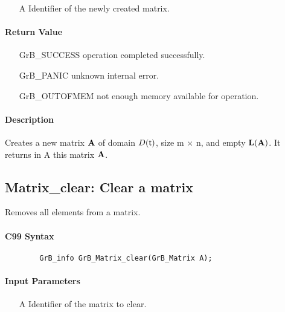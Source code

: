 \begin{itemize}[leftmargin=1.1in]
    \item[{\sf A}] Identifier of the newly created matrix.
\end{itemize}

\paragraph{Return Value}

\begin{itemize}[leftmargin=2.1in]
\item[{\sf GrB\_SUCCESS}]   operation completed successfully.
\item[{\sf GrB\_PANIC}]     unknown internal error.
\item[{\sf GrB\_OUTOFMEM}]  not enough memory available for operation.
\end{itemize}

\paragraph{Description}

Creates a new matrix ${\bf A}$ of domain $D({\sf t})$, size {\sf m $\times$ n}, and
empty $\bold{L}({\bf A})$. It returns in {\sf A} this matrix ${\bf A}$.

\subsection{{\sf Matrix\_clear}: Clear a matrix}

Removes all elements from a matrix.

\paragraph{C99 Syntax}

\begin{verbatim}
        GrB_info GrB_Matrix_clear(GrB_Matrix A);
\end{verbatim}

\paragraph{Input Parameters}

\begin{itemize}[leftmargin=1.1in]
    \item[{\sf A}] Identifier of the matrix to clear.
\end{itemize}

